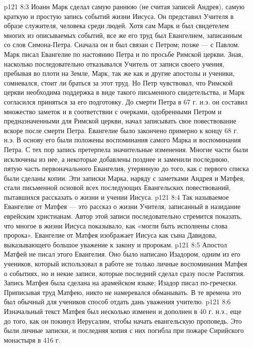 \vs p121 8:3 \bibnobreakspace {} Иоанн Марк сделал самую раннюю (не считая записей Андрея), самую краткую и простую запись событий жизни Иисуса. Он представил Учителя в образе служителя, человека среди людей. Хотя сам Марк и был свидетелем многих из описываемых событий, все же его труд был Евангелием, записанным со слов Симона\hyp{}Петра. Сначала он и был связан с Петром; позже --- с Павлом. Марк писал Евангелие по настоянию Петра и по просьбе Римской церкви. Зная, насколько последовательно отказывался Учитель от записи своего учения, пребывая во плоти на Земле, Марк, так же как и другие апостолы и ученики, сомневался, стоит ли браться за этот труд. Но Петр чувствовал, что Римской церкви необходима поддержка в виде такого письменного свидетельства, и Марк согласился приняться за его подготовку. До смерти Петра в 67 г. н.э. он составил множество заметок и в соответствии с очерками, одобренными Петром и предназначенными для Римской церкви, начал записывать свое повествование вскоре после смерти Петра. Евангелие было закончено примерно к концу 68 г. н.э. В основу его были положены воспоминания самого Марка и воспоминания Петра. С тех пор запись претерпела значительные изменения. Многие части были исключены из нее, а некоторые добавлены позднее и заменили последнюю, пятую часть первоначального Евангелия, утерянную до того, как с первого списка были сделаны копии. Эти записки Марка, наряду с заметками Андрея и Матфея, стали письменной основой всех последующих Евангельских повествований, пытавшихся рассказать о жизни и учении Иисуса.
\vs p121 8:4 \bibnobreakspace {} Так называемое Евангелие от Матфея --- это рассказ о жизни Учителя, записанный в назидание еврейским христианам. Автор этой записи последовательно стремится показать, что многое в жизни Иисуса показывало, как «могли быть исполнены слова пророка». Евангелие от Матфея изображает Иисуса как сына Давидова, выказывающего большое уважение к закону и пророкам.
\vs p121 8:5 Апостол Матфей не писал этого Евангелия. Оно было написано Изадором, одним из его учеников, который использовал в работе не только личные воспоминания Матфея о событиях, но и некие записи, которые последний сделал сразу после Распятия. Запись Матфея была сделана на арамейском языке; Изадор писал по\hyp{}гречески. Приписывая труд Матфею, никто не намеревался обманывать. В те времена это был обычный для учеников способ отдать дань уважения учителю.
\vs p121 8:6 Изначальный текст Матфея был несколько изменен и дополнен в 40 г. н.э., еще до того, как он покинул Иерусалим, чтобы начать евангельскую проповедь. Это были личные записки, и последняя копия с них погибла при пожаре Сирийского монастыря в 416 г.
